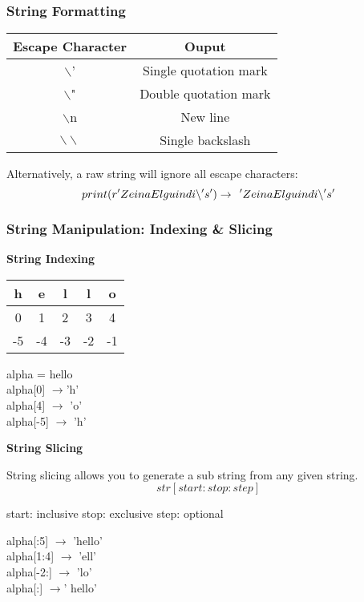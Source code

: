 \subsubsection{String Formatting}
\begin{center}
    \begin{tabular}{c|c}
    Escape Character & Ouput  \\
    \hline
    $\backslash$' & Single quotation mark \\
    $\backslash$" & Double quotation mark\\
    $\backslash$n & New line\\
    $\backslash\backslash$ & Single backslash\\
    \end{tabular}
\end{center}

Alternatively, a raw string will ignore all escape characters:
\[print(r'Zeina Elguindi\backslash's') \rightarrow \hspace{0.15cm} 'Zeina Elguindi\backslash's'\]

\subsubsection{String Manipulation: Indexing \& Slicing}
\textbf{String Indexing}
\begin{center}
    \begin{tabular}{ccccc}
        h & e & l & l & o \\
        \hline
        0 & 1 & 2 & 3 & 4 \\
        -5 & -4 & -3 & -2 & -1 \\
    \end{tabular}
\end{center}

\begin{center}
    alpha = hello\\[0.25cm]
    alpha[0] $\rightarrow$'h'\\[0.25cm]
    alpha[4] $\rightarrow$ 'o'\\[0.25cm]
    alpha[-5] $\rightarrow$ 'h'\\[0.25cm]
\end{center}
\textbf{String Slicing}

String slicing allows you to generate a sub string from any given string.
\textbf{\[str[start:stop:step]\]}
\begin{center}
start: inclusive \hspace{0.5cm} stop: exclusive \hspace{0.5cm} step: optional\\
\end{center}
\begin{center}
   alpha[:5] $\rightarrow$ 'hello' \\[0.25cm]
   alpha[1:4] $\rightarrow$ 'ell'\\[0.25cm]
   alpha[-2:] $\rightarrow$  'lo'\\[0.25cm]
   alpha[:] $\rightarrow$' hello'
\end{center}

